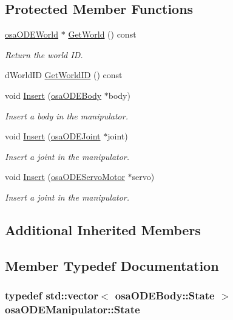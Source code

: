 \subsection*{Protected Member Functions}
\begin{DoxyCompactItemize}
\item 
\hyperlink{classosa_o_d_e_world}{osa\-O\-D\-E\-World} $\ast$ \hyperlink{classosa_o_d_e_manipulator_a9d6017215f555ce41f107441d362faa6}{Get\-World} () const 
\begin{DoxyCompactList}\small\item\em Return the world I\-D. \end{DoxyCompactList}\item 
d\-World\-I\-D \hyperlink{classosa_o_d_e_manipulator_ab121c4ede642ec90e0522d8e7a1c693c}{Get\-World\-I\-D} () const 
\item 
void \hyperlink{classosa_o_d_e_manipulator_a659fb1e1f1fe5e8b2a70d40ce33173b9}{Insert} (\hyperlink{classosa_o_d_e_body}{osa\-O\-D\-E\-Body} $\ast$body)
\begin{DoxyCompactList}\small\item\em Insert a body in the manipulator. \end{DoxyCompactList}\item 
void \hyperlink{classosa_o_d_e_manipulator_aea69b012a10e675b2c2f614c1462edfe}{Insert} (\hyperlink{classosa_o_d_e_joint}{osa\-O\-D\-E\-Joint} $\ast$joint)
\begin{DoxyCompactList}\small\item\em Insert a joint in the manipulator. \end{DoxyCompactList}\item 
void \hyperlink{classosa_o_d_e_manipulator_a32b6281c41f447bb25256c0f271b2f15}{Insert} (\hyperlink{classosa_o_d_e_servo_motor}{osa\-O\-D\-E\-Servo\-Motor} $\ast$servo)
\begin{DoxyCompactList}\small\item\em Insert a joint in the manipulator. \end{DoxyCompactList}\end{DoxyCompactItemize}
\subsection*{Additional Inherited Members}


\subsection{Member Typedef Documentation}
\hypertarget{classosa_o_d_e_manipulator_a56c8457aa6c0240b62580dcfce383ed2}{
\subsubsection[{State}]{\setlength{\rightskip}{0pt plus 5cm}typedef std\-::vector$<$ {\bf osa\-O\-D\-E\-Body\-::\-State} $>$ {\bf osa\-O\-D\-E\-Manipulator\-::\-State}}}\label{classosa_o_d_e_manipulator_a56c8457aa6c0240b62580dcfce383ed2}


